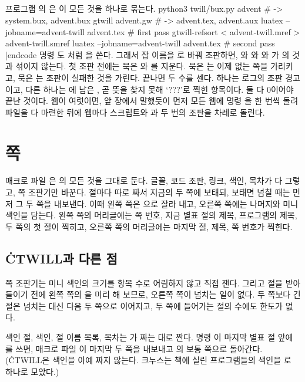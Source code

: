 \section{}
프로그램 의 은 이 모든 것을  하나로
묶는다.
\begincode
python3 twill/bux.py advent              # -> system.bux, advent.bux
gtwill advent.gw                         # -> advent.tex, advent.aux
luatex --jobname=advent-twill advent.tex # first pass
gtwill-refsort < advent-twill.mref > advent-twill.smref
luatex --jobname=advent-twill advent.tex # second pass
|endcode
명령 도 처럼 을 쓴다. 그래서 잡 이름을
로 바꿔 조판하면, 와 와 와
가 의 것과 섞이지 않는다. 첫 조판 전에는 묵은
와 를 지운다. 묵은 는 이제 없는 쪽을 가리키고, 묵은
는 조판이 실패한 것을 가린다. 끝나면 두 수를 센다. 하나는 로그의 조판
경고이고, 다른 하나는 에 남은 , 곧 뜻을 찾지 못해
`???'로 찍힌 항목이다. 둘 다 0이어야 끝난 것이다. 웹이 여럿이면, 앞 장에서 말했듯이
먼저 모든 웹에 명령 을 한 번씩 돌려  파일을 다 마련한 뒤에
웹마다 스크립트와 과 두 번의 조판을 차례로 돌린다.

\chapter{쪽}
\noindent 매크로 파일 은 의 모든 것을 그대로 둔다.
글꼴, 코드 조판, 링크, 색인, 목차가 다 그렇고, 쪽 조판기만 바꾼다. 절마다 따로
짜서 지금의 두 쪽에 보태되, 보태면 넘칠 때는 먼저 그 두 쪽을 내보낸다. 이때 왼쪽
쪽은 으로 잘라 내고, 오른쪽 쪽에는 나머지와 미니 색인을 담는다. 왼쪽
쪽의 머리글에는 쪽 번호, 지금 별표 절의 제목, 프로그램의 제목, 두 쪽의 첫 절이
찍히고, 오른쪽 쪽의 머리글에는 마지막 절, 제목, 쪽 번호가 찍힌다.

\section{\.{CTWILL}과 다른 점}
\bull 쪽 조판기는 미니 색인의 크기를 항목 수로 어림하지 않고 직접 잰다. 그리고 절을
받아들이기 전에 왼쪽 쪽의 을 미리 해 보므로, 오른쪽 쪽이 넘치는 일이
없다. 두 쪽보다 긴 절은 넘치는 대신 다음 두 쪽으로 이어지고, 두 쪽에 들어가는 절의
수에도 한도가 없다.

\bull 색인 절, 색인, 절 이름 목록, 목차는 가 짜는 대로 짠다. 명령
이 마지막 별표 절 앞에 를 쓰면, 매크로 파일
이 마지막 두 쪽을 내보내고 의 보통 쪽으로 돌아간다.
(\.{CTWILL}은 색인을 아예 짜지 않는다. 크누스는 책에 실린 프로그램들의 색인을
로 하나로 모았다.)

